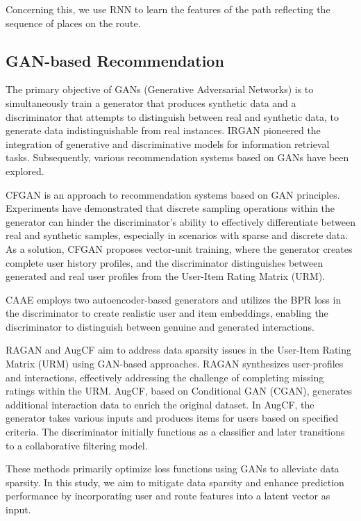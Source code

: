 \documentclass[]{article}
\begin{document}
Concerning this, we use RNN to learn the features of the path reflecting the sequence of places on the route.

\subsection{GAN-based Recommendation} 
The primary objective of GANs (Generative Adversarial Networks) is to simultaneously train a generator that produces synthetic data and a discriminator that attempts to distinguish between real and synthetic data, to generate data indistinguishable from real instances. IRGAN pioneered the integration of generative and discriminative models for information retrieval tasks. Subsequently, various recommendation systems based on GANs have been explored.

CFGAN is an approach to recommendation systems based on GAN principles. Experiments have demonstrated that discrete sampling operations within the generator can hinder the discriminator's ability to effectively differentiate between real and synthetic samples, especially in scenarios with sparse and discrete data. As a solution, CFGAN proposes vector-unit training, where the generator creates complete user history profiles, and the discriminator distinguishes between generated and real user profiles from the User-Item Rating Matrix (URM).

CAAE \cite{Chae2019a} employs two autoencoder-based generators and utilizes the BPR loss in the discriminator to create realistic user and item embeddings, enabling the discriminator to distinguish between genuine and generated interactions.

RAGAN \cite{Chae2019} and AugCF \cite{Wang2019} aim to address data sparsity issues in the User-Item Rating Matrix (URM) using GAN-based approaches. RAGAN synthesizes user-profiles and interactions, effectively addressing the challenge of completing missing ratings within the URM. AugCF, based on Conditional GAN (CGAN), generates additional interaction data to enrich the original dataset. In AugCF, the generator takes various inputs and produces items for users based on specified criteria. The discriminator initially functions as a classifier and later transitions to a collaborative filtering model.

These methods primarily optimize loss functions using GANs to alleviate data sparsity. In this study, we aim to mitigate data sparsity and enhance prediction performance by incorporating user and route features into a latent vector as input.
\end{document}
